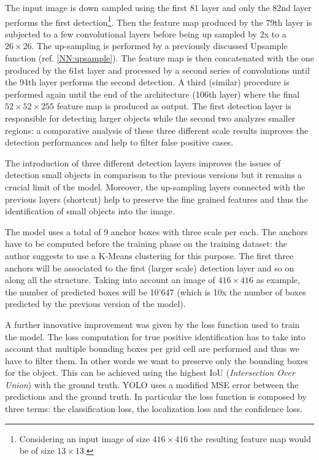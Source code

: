 \documentclass{standalone}
\begin{document}
The input image is down sampled using the first 81 layer and only the 82nd layer performs the first detection\footnote{
  Considering an input image of size $416\times416$ the resulting feature map would be of size $13\times13$.
}.
Then the feature map produced by the 79th layer is subjected to a few convolutional layers before being up sampled by 2x to a $26\times26$.
The up-sampling is performed by a previously discussed Upsample function (ref. \ref{NN:upsample}).
The feature map is then concatenated with the one produced by the 61st layer and processed by a second series of convolutions until the 94th layer performs the second detection.
A third (similar) procedure is performed again until the end of the architecture (106th layer) where the final $52\times52\times255$ feature map is produced as output.
The first detection layer is responsible for detecting larger objects while the second two analyzes smaller regions: a comparative analysis of these three different scale results improves the detection performances and help to filter false positive cases.

The introduction of three different detection layers improves the issues of detection small objects in comparison to the previous versions but it remains a crucial limit of the model.
Moreover, the up-sampling layers connected with the previous layers (shortcut) help to preserve the fine grained features and thus the identification of small objects into the image.

The model uses a total of 9 anchor boxes with three scale per each.
The anchors have to be computed before the training phase on the training dataset: the author suggests to use a K-Means clustering for this purpose.
The first three anchors will be associated to the first (larger scale) detection layer and so on along all the structure.
Taking into account an image of $416\times416$ as example, the number of predicted boxes will be 10'647 (which is 10x the number of boxes predicted by the previous version of the model).

A further innovative improvement was given by the loss function used to train the model.
The loss computation for true positive identification has to take into account that multiple bounding boxes per grid cell are performed and thus we have to filter them.
In other words we want to preserve only the bounding boxes  for the object.
This can be achieved using the highest IoU (\emph{Intersection Over Union}) with the ground truth.
YOLO uses a modified MSE error between the predictions and the ground truth.
In particular the loss function is composed by three terms: the classification loss, the localization loss and the confidence loss.
\end{document}
